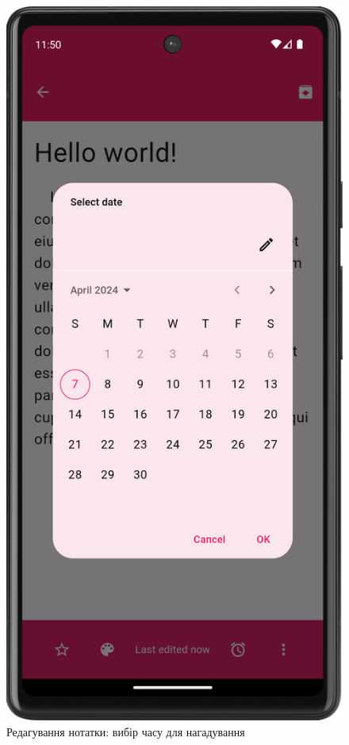 \documentclass[oneside,14pt]{extarticle}
\begin{document}
\begin{normalsize}
	
	\begin{figure}[H]
		\begin{minipage}{0.48\textwidth}
			\centering
			\includegraphics[scale=0.12]{5}
			\caption{Редагування нотатки: вибір часу для нагадування}

\end{minipage}
\end{figure}
\end{normalsize}
\end{document}
